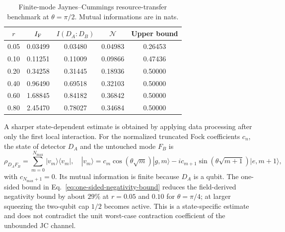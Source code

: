 \documentclass[pdflatex,sn-mathphys-num]{sn-jnl}
\begin{document}
\begin{table}[htbp]
\centering
\small
\caption{Finite-mode Jaynes--Cummings resource-transfer benchmark at $\theta=\pi/2$. Mutual informations are in nats.}
\label{tab:jc-transfer-data}
\begin{tabular}{ccccc}
\toprule
$r$ & $I_{\rm F}$ & $I(D_A:D_B)$ & $\mathcal N$ & Upper bound\\
\midrule
0.05 & 0.03499 & 0.03480 & 0.04983 & 0.26453\\
0.10 & 0.11251 & 0.11009 & 0.09866 & 0.47436\\
0.20 & 0.34258 & 0.31445 & 0.18936 & 0.50000\\
0.40 & 0.96490 & 0.69518 & 0.32103 & 0.50000\\
0.60 & 1.68845 & 0.84182 & 0.36842 & 0.50000\\
0.80 & 2.45470 & 0.78027 & 0.34684 & 0.50000\\
\bottomrule
\end{tabular}
\end{table}

A sharper state-dependent estimate is obtained by applying data processing after only the first local interaction. For the normalized truncated Fock coefficients $c_n$, the state of detector $D_A$ and the untouched mode $F_B$ is
\begin{equation}
\rho_{D_AF_B}=\sum_{m=0}^{N_{\max}}|v_m\rangle\langle v_m|,
\quad
|v_m\rangle=c_m\cos(\theta\sqrt m)|g,m\rangle
-i c_{m+1}\sin(\theta\sqrt{m+1})|e,m+1\rangle,
\label{eq:jc-one-sided-state}
\end{equation}
with $c_{N_{\max}+1}=0$. Its mutual information is finite because $D_A$ is a qubit. The one-sided bound in Eq.~\eqref{eq:one-sided-negativity-bound} reduces the field-derived negativity bound by about $29\%$ at $r=0.05$ and $0.10$ for $\theta=\pi/4$; at larger squeezing the two-qubit cap $1/2$ becomes active. This is a state-specific estimate and does not contradict the unit worst-case contraction coefficient of the unbounded JC channel.
\end{document}
